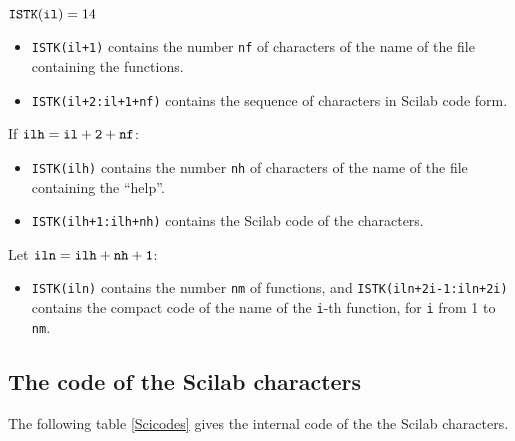 ${\tt ISTK(il)}=14$

\begin{itemize}

\item{\tt ISTK(il+1)} contains the number {\tt nf} of  characters 
of the name of the file containing the functions.

\item{\tt  ISTK(il+2:il+1+nf)} contains the sequence of characters in
Scilab code form.

\end{itemize}

If ${\tt ilh}={\tt il+2+nf}$:

\begin{itemize}

\item{\tt ISTK(ilh)} contains the number {\tt nh} of  characters of
the name of the file containing the ``help''.

\item{\tt    ISTK(ilh+1:ilh+nh)} contains the Scilab code of the characters.

\end{itemize}

Let ${\tt iln}={\tt ilh+nh+1}$:

\begin{itemize}

\item{\tt   ISTK(iln)}  contains the number  {\tt   nm} of functions,
and  {\tt ISTK(iln+2i-1:iln+2i)} contains the compact code
of the name of the {\tt i}-th function, for {\tt i}  from 1 to {\tt
nm}.

\end{itemize}
\subsection{The code of the Scilab characters}
The following table \ref{Scicodes} gives the internal code of the the Scilab 
characters.
\label{car}


